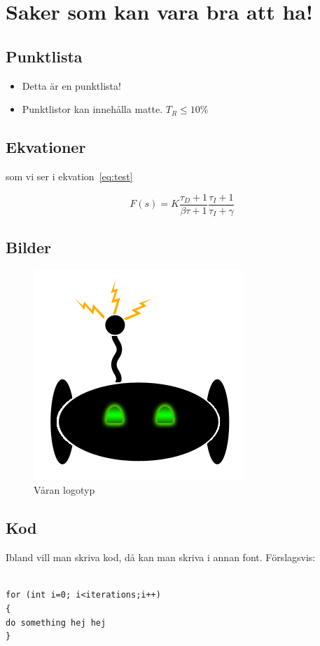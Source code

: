 \documentclass[a4paper,12pt,fleqn]{article}
\begin{document}
	
\tableofcontents
\thispagestyle{fancy}
\newpage

\section{Saker som kan vara bra att ha!}

\subsection{Punktlista}
\begin{itemize}
  \item Detta är en punktlista! 
  \item Punktlistor kan innehålla matte. $T_R \leq 10\%$
\end{itemize}

\subsection{Ekvationer}

som vi ser i ekvation~\ref{eq:test} %

\begin{equation}
F(s)= K\frac{\tau_D+1}{\beta\tau+1}\frac{\tau_I+1}{\tau_I+\gamma}	
	\label{eq:test} %
\end{equation} 

\subsection{Bilder}


\begin{figure}[htp] %
  \begin{center}
  \includegraphics[keepaspectratio=true,scale=0.8]{logotyp}  %
  \end{center}
  \caption{Våran logotyp} %
\end{figure}

\subsection{Kod}
Ibland vill man skriva kod, då kan man skriva i annan font. Förslagsvis:
\\ %

\begin {lstlisting}

for (int i=0; i<iterations;i++)
{
do something hej hej
}
\end{lstlisting}
\end{document}
